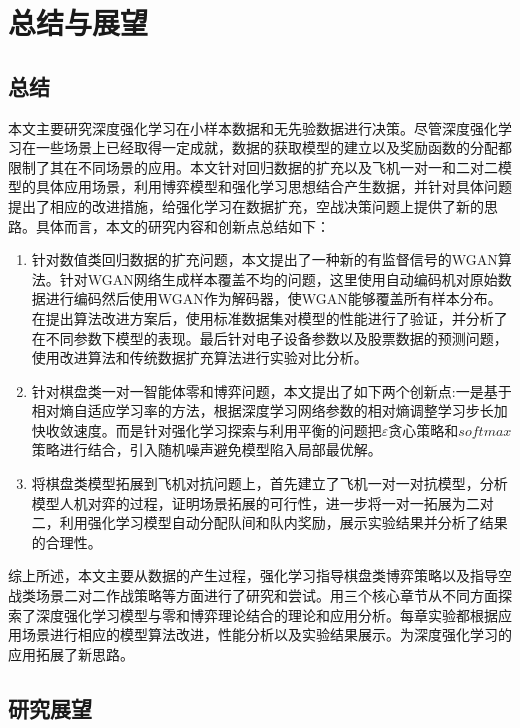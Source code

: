 \chapter{总结与展望}
\section{总结}
本文主要研究深度强化学习在小样本数据和无先验数据进行决策。尽管深度强化学习在一些场景上已经取得一定成就，数据的获取模型的建立以及奖励函数的分配都限制了其在不同场景的应用。本文针对回归数据的扩充以及飞机一对一和二对二模型的具体应用场景，利用博弈模型和强化学习思想结合产生数据，并针对具体问题提出了相应的改进措施，给强化学习在数据扩充，空战决策问题上提供了新的思路。{\tiny }具体而言，本文的研究内容和创新点总结如下：
\begin{enumerate}
	\item  针对数值类回归数据的扩充问题，本文提出了一种新的有监督信号的WGAN算法。针对WGAN网络生成样本覆盖不均的问题，这里使用自动编码机对原始数据进行编码然后使用WGAN作为解码器，使WGAN能够覆盖所有样本分布。在提出算法改进方案后，使用标准数据集对模型的性能进行了验证，并分析了在不同参数下模型的表现。最后针对电子设备参数以及股票数据的预测问题，使用改进算法和传统数据扩充算法进行实验对比分析。
	\item 针对棋盘类一对一智能体零和博弈问题，本文提出了如下两个创新点:一是基于相对熵自适应学习率的方法，根据深度学习网络参数的相对熵调整学习步长加快收敛速度。而是针对强化学习探索与利用平衡的问题把$\varepsilon$贪心策略和$softmax$策略进行结合，引入随机噪声避免模型陷入局部最优解。
	\item 将棋盘类模型拓展到飞机对抗问题上，首先建立了飞机一对一对抗模型，分析模型人机对弈的过程，证明场景拓展的可行性，进一步将一对一拓展为二对二，利用强化学习模型自动分配队间和队内奖励，展示实验结果并分析了结果的合理性。
\end{enumerate}

综上所述，本文主要从数据的产生过程，强化学习指导棋盘类博弈策略以及指导空战类场景二对二作战策略等方面进行了研究和尝试。用三个核心章节从不同方面探索了深度强化学习模型与零和博弈理论结合的理论和应用分析。每章实验都根据应用场景进行相应的模型算法改进，性能分析以及实验结果展示。为深度强化学习的应用拓展了新思路。

\section{研究展望}

